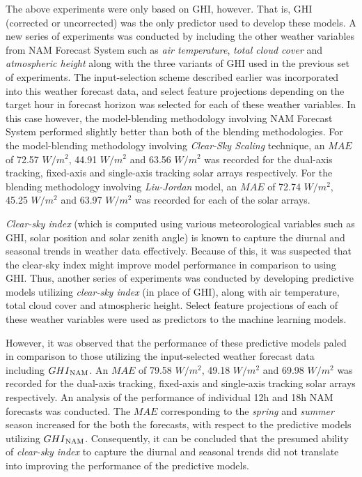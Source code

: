 \par The above experiments were only based on GHI, however. That is, GHI (corrected or uncorrected) was the only predictor used to develop these models. A new series of experiments was conducted by including the other weather variables from NAM Forecast System such as \textit{air temperature}, \textit{total cloud cover} and \textit{atmospheric height} along with the three variants of GHI used in the previous set of experiments. The input-selection scheme described earlier was incorporated into this weather forecast data, and select feature projections depending on the target hour in forecast horizon was selected for each of these weather variables. In this case however, the model-blending methodology involving NAM Forecast System performed slightly better than both of the blending methodologies. For the model-blending methodology involving \textit{Clear-Sky Scaling} technique, an $MAE$ of 72.57 $W/m^2$, 44.91 $W/m^2$ and 63.56 $W/m^2$ was recorded for the dual-axis tracking, fixed-axis and single-axis tracking solar arrays respectively. For the blending methodology involving \textit{Liu-Jordan} model, an $MAE$ of 72.74 $W/m^2$, 45.25 $W/m^2$ and 63.97 $W/m^2$ was recorded for each of the solar arrays.
\vspace{1.25em}

\par\textit{Clear-sky index} (which is computed using various meteorological variables such as GHI, solar position and solar zenith angle) is known to capture the diurnal and seasonal trends in weather data effectively. Because of this, it was suspected that the clear-sky index might improve model performance in comparison to using GHI. Thus, another series of experiments was conducted by developing predictive models utilizing \textit{clear-sky index} (in place of GHI), along with air temperature, total cloud cover and atmospheric height. Select feature projections of each of these weather variables were used as predictors to the machine learning models.

\par However, it was observed that the performance of these predictive models paled in comparison to those utilizing the input-selected weather forecast data including $GHI\textsubscript{NAM}$. An $MAE$ of 79.58 $W/m^2$, 49.18 $W/m^2$ and 69.98 $W/m^2$ was recorded for the dual-axis tracking, fixed-axis and single-axis tracking solar arrays respectively. An analysis of the performance of individual 12h and 18h NAM forecasts was conducted. The $MAE$ corresponding to the \textit{spring} and \textit{summer} season increased for the both the forecasts, with respect to the predictive models utilizing $GHI\textsubscript{NAM}$. Consequently, it can be concluded that the presumed ability of \textit{clear-sky index} to capture the diurnal and seasonal trends did not translate into improving the performance of the predictive models.

